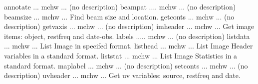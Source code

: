 \par{\eightpoint\begintt
annotate ... mchw ... (no description)
beampat .... mchw ... (no description)
beamsize ... mchw ... Find beam size and location.
getconts ... mchw ... (no description)
getvaxis ... mchw ... (no description)
\endtt}
{\eightpoint\begintt
imheader ... mchw ... Get image items: object, restfreq and date-obs.
labels ..... mchw ... (no description)
listdata ... mchw ... List Image in specifed format.
listhead ... mchw ... List Image Header variables in a standard format.
liststat ... mchw ... List Image Statistics in a standard format.
\endtt}
{\eightpoint\begintt
maplabel ... mchw ... (no description)
setconts ... mchw ... (no description)
uvheader ... mchw ... Get uv variables: source, restfreq and date.
\endtt}
